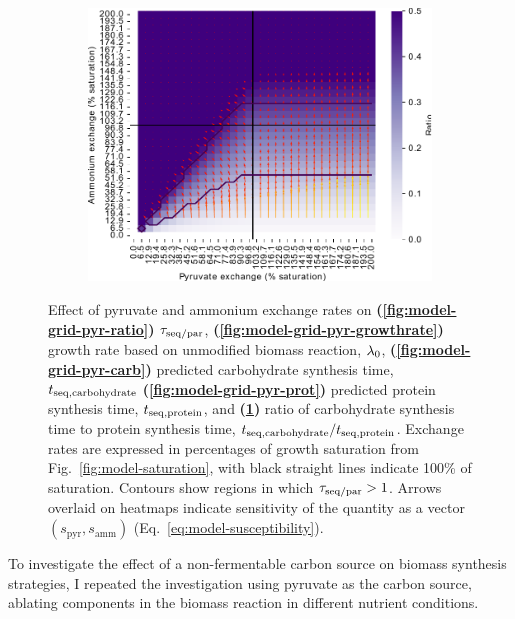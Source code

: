 \begin{figure}
  \begin{subfigure}[t]{0.45\textwidth}
  \centering
    \includegraphics[width=\linewidth]{ec_grid_pyr_amm_carb_to_prot}
    \caption{
    }
    \label{fig:model-grid-pyr-carb-to-prot}
  \end{subfigure}
  \caption[
    Effect of pyruvate and ammonium exchange rates
  ]{
    Effect of pyruvate and ammonium exchange rates on \textbf{(\ref{fig:model-grid-pyr-ratio})} $\tau_{\mathrm{seq}/\mathrm{par}}$, \textbf{(\ref{fig:model-grid-pyr-growthrate})} growth rate based on unmodified biomass reaction, $\lambda_{0}$, \textbf{(\ref{fig:model-grid-pyr-carb})} predicted carbohydrate synthesis time, $t_{\mathrm{seq},\mathrm{carbohydrate}}$ \textbf{(\ref{fig:model-grid-pyr-prot})} predicted protein synthesis time, $t_{\mathrm{seq},\mathrm{protein}}$, and \textbf{(\ref{fig:model-grid-pyr-carb-to-prot})} ratio of carbohydrate synthesis time to protein synthesis time, $t_{\mathrm{seq},\mathrm{carbohydrate}}/t_{\mathrm{seq},\mathrm{protein}}$.
    Exchange rates are expressed in percentages of growth saturation from Fig.\ \ref{fig:model-saturation}, with black straight lines indicate 100\% of saturation.
    Contours show regions in which $\tau_{\mathrm{seq}/\mathrm{par}} > 1$.
    Arrows overlaid on heatmaps indicate sensitivity of the quantity as a vector $(s_{\mathrm{pyr}}, s_{\mathrm{amm}})$ (Eq.\ \ref{eq:model-susceptibility}).
  }
  \label{fig:model-grid-pyr}
\end{figure}

To investigate the effect of a non-fermentable carbon source on biomass synthesis strategies, I repeated the investigation using pyruvate as the carbon source, ablating components in the biomass reaction in different nutrient conditions.%

